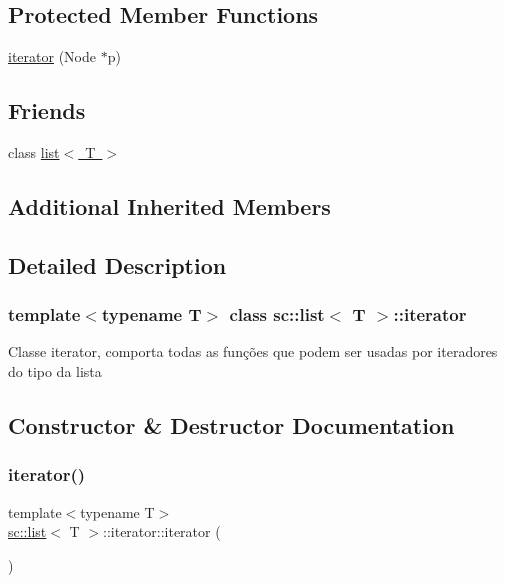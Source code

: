 \subsection*{Protected Member Functions}
\begin{DoxyCompactItemize}
\item 
\mbox{\hyperlink{classsc_1_1list_1_1iterator_a818795d7651516a93e563f3229e86351}{iterator}} (Node $\ast$p)
\end{DoxyCompactItemize}
\subsection*{Friends}
\begin{DoxyCompactItemize}
\item 
class \mbox{\hyperlink{classsc_1_1list_1_1iterator_ab6cf03d50c50087700b0fb872accfa7b}{list$<$ T $>$}}
\end{DoxyCompactItemize}
\subsection*{Additional Inherited Members}


\subsection{Detailed Description}
\subsubsection*{template$<$typename T$>$\newline
class sc\+::list$<$ T $>$\+::iterator}

Classe iterator, comporta todas as funções que podem ser usadas por iteradores do tipo da lista 

\subsection{Constructor \& Destructor Documentation}
\mbox{\label{classsc_1_1list_1_1iterator_acd90feec03d8a2762f36407a27166bb9}} 
\subsubsection{\texorpdfstring{iterator()}{iterator()}\hspace{0.1cm}{\footnotesize\ttfamily [1/2]}}
{\footnotesize\ttfamily template$<$typename T$>$ \\
\mbox{\hyperlink{classsc_1_1list}{sc\+::list}}$<$ T $>$\+::iterator\+::iterator (\begin{DoxyParamCaption}{ }\end{DoxyParamCaption})\hspace{0.3cm}{\ttfamily [inline]}}

